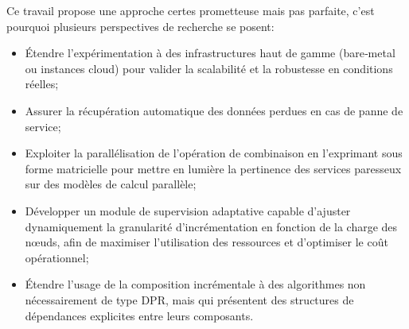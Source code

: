 
Ce travail propose une approche certes prometteuse mais pas parfaite, c'est pourquoi plusieurs perspectives de recherche se posent: 
\begin{itemize}
    \item Étendre l’expérimentation à des infrastructures haut de gamme (bare‑metal ou instances cloud) pour valider la scalabilité et la robustesse en conditions réelles;
    \item Assurer la récupération automatique des données perdues en cas de panne de service;
    \item Exploiter la parallélisation de l’opération de combinaison en l’exprimant sous forme matricielle pour mettre en lumière la pertinence des services paresseux sur des modèles de calcul parallèle;
    \item Développer un module de supervision adaptative capable d’ajuster dynamiquement la granularité d’incrémentation en fonction de la charge des nœuds, afin de maximiser l’utilisation des ressources et d’optimiser le coût opérationnel;
    \item Étendre l’usage de la composition incrémentale à des algorithmes non nécessairement de type DPR, mais qui présentent des structures de dépendances explicites entre leurs composants.%
\end{itemize}

\myCleanStarChapterEnd

\myCleanStarChapterEnd
